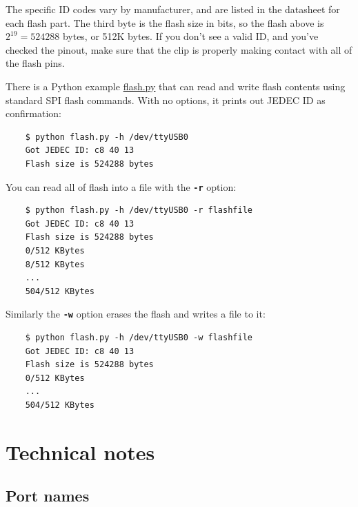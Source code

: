 \documentclass{article}
\newcommand{\mach}[1]{\texttt{\textbf{#1}}}
\begin{document}
The specific ID codes vary by manufacturer, and are listed in the datasheet for each flash part.
The third byte is the flash size in bits, so the flash above is
$2^{19} = 524288$ bytes, or 512K bytes.
If you don't see a valid ID, and you've checked the pinout,
make sure that the clip is properly making contact with all of the flash pins.

There is a Python example
\href{https://github.com/jamesbowman/spidriver/blob/master/python/samples/flash.py>}{flash.py}
that can read and write flash contents using standard
SPI flash commands.
With no options, it prints out JEDEC ID as confirmation:

\begin{lstlisting}
    $ python flash.py -h /dev/ttyUSB0
    Got JEDEC ID: c8 40 13
    Flash size is 524288 bytes
\end{lstlisting}

You can read all of flash into a file with the \mach{-r} option:

\begin{lstlisting}
    $ python flash.py -h /dev/ttyUSB0 -r flashfile
    Got JEDEC ID: c8 40 13
    Flash size is 524288 bytes
    0/512 KBytes
    8/512 KBytes
    ...
    504/512 KBytes
\end{lstlisting}

Similarly the \mach{-w} option erases the flash and writes a file to it:

\begin{lstlisting}
    $ python flash.py -h /dev/ttyUSB0 -w flashfile
    Got JEDEC ID: c8 40 13
    Flash size is 524288 bytes
    0/512 KBytes
    ...
    504/512 KBytes
\end{lstlisting}

% 
% 

\newpage
\section{Technical notes}

\subsection{Port names}
\end{document}
